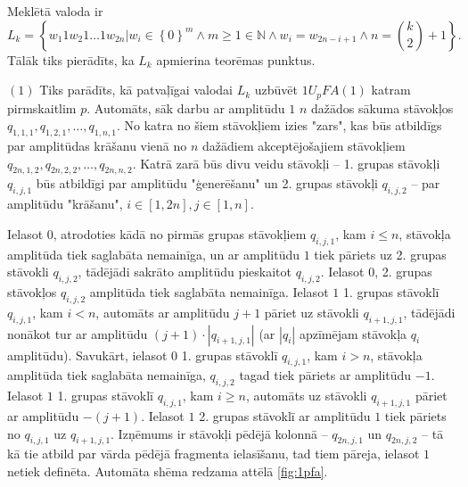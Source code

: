 \documentclass{ludis}
\begin{document}
\begin{pieradijums} Meklētā valoda ir
\[
L_k = \left\{ w_1 1 w_2 1 \ldots 1 w_{2n} |
		w_i \in \left\{ 0 \right\}^m \wedge
		m \geq 1 \in \mathbb{N} \wedge
		w_i = w_{2n-i+1} \wedge
		n={k\choose 2}+1 \right\}.
\]
Tālāk tiks pierādīts, ka $L_k$ apmierina teorēmas punktus.

$(1)$ Tiks parādīts, kā patvaļīgai valodai $L_k$ uzbūvēt $1U_pFA(1)$ katram pirmskaitlim $p$. Automāts, sāk darbu ar amplitūdu $1$ $n$ dažādos sākuma stāvokļos $q_{1,1,1},q_{1,2,1},\ldots,q_{1,n,1}$. No katra no šiem stāvokļiem izies "zars", kas būs atbildīgs par amplitūdas krāšanu vienā no $n$ dažādiem akceptējošajiem stāvokļiem $q_{2n,1,2},q_{2n,2,2},\ldots,q_{2n,n,2}$. Katrā zarā būs divu veidu stāvokļi -- 1. grupas stāvokļi $q_{i,j,1}$ būs atbildīgi par amplitūdu "ģenerēšanu" un 2. grupas stāvokļi $q_{i,j,2}$ -- par amplitūdu "krāšanu", $i \in \left[1, 2n \right], j \in \left[1, n \right]$.

Ielasot $0$, atrodoties kādā no pirmās grupas stāvokļiem $q_{i,j,1}$, kam $i \leq n$, stāvokļa amplitūda tiek saglabāta nemainīga, un ar amplitūdu $1$ tiek pāriets uz 2. grupas stāvokli $q_{i,j,2}$, tādējādi sakrāto amplitūdu pieskaitot $q_{i,j,2}$. Ielasot $0$, 2. grupas stāvokļos $q_{i,j,2}$ amplitūda tiek saglabāta nemainīga. Ielasot $1$ 1. grupas stāvoklī $q_{i,j,1}$, kam $i < n$, automāts ar amplitūdu $j + 1$ pāriet uz stāvokli $q_{i + 1,j,1}$, tādējādi nonākot tur ar amplitūdu $(j + 1) \cdot \left| q_{i + 1,j,1} \right|$ (ar $|q_i|$ apzīmējam stāvokļa $q_i$ amplitūdu).
Savukārt, ielasot $0$ 1. grupas stāvoklī $q_{i,j,1}$, kam $i > n$, stāvokļa amplitūda tiek saglabāta nemainīga, $q_{i,j,2}$ tagad tiek pāriets ar amplitūdu $-1$. Ielasot $1$ 1. grupas stāvoklī $q_{i,j,1}$, kam $i \geq n$, automāts uz stāvokli $q_{i + 1,j,1}$ pāriet ar amplitūdu $-(j + 1)$. Ielasot $1$ 2. grupas stāvoklī ar amplitūdu $1$ tiek pāriets no $q_{i,j,1}$ uz $q_{i + 1,j,1}$. Izņēmums ir stāvokļi pēdējā kolonnā -- $q_{2n,j,1}$ un $q_{2n,j,2}$ -- tā kā tie atbild par vārda pēdējā fragmenta ielasīšanu, tad tiem pāreja, ielasot $1$ netiek definēta. Automāta shēma redzama attēlā \ref{fig:1pfa}.


\end{pieradijums}
\end{document}
